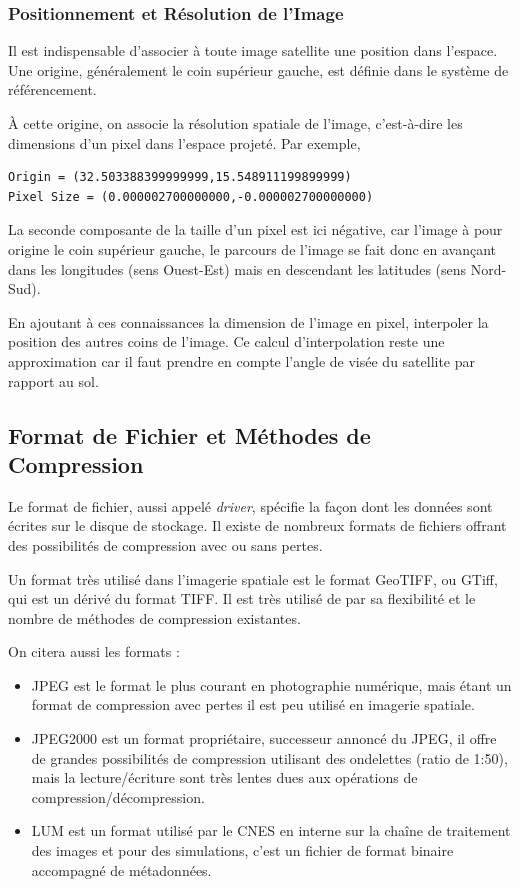 \documentclass[a4paper, 10pt]{report}
\begin{document}
\subsubsection{Positionnement et Résolution de l'Image}
Il est indispensable d'associer à toute image satellite une position dans l'espace. Une origine, généralement le coin supérieur gauche, est définie dans le système de référencement.

À cette origine, on associe la résolution spatiale de l'image, c'est-à-dire les dimensions d'un pixel dans l'espace projeté.
Par exemple,
\begin{verbatim}
Origin = (32.503388399999999,15.548911199899999)
Pixel Size = (0.000002700000000,-0.000002700000000)
\end{verbatim}
La seconde composante de la taille d'un pixel est ici négative, car l'image à pour origine le coin supérieur gauche, le parcours de l'image se fait donc en avançant dans les longitudes (sens Ouest-Est) mais en descendant les latitudes (sens Nord-Sud).

En ajoutant à ces connaissances la dimension de l'image en pixel, interpoler la position des autres coins de l'image. Ce calcul d'interpolation reste une approximation car il faut prendre en compte l'angle de visée du satellite par rapport au sol.

\subsection{Format de Fichier et Méthodes de Compression}
Le format de fichier, aussi appelé \emph{driver}, spécifie la façon dont les données sont écrites sur le disque de stockage.
Il existe de nombreux formats de fichiers offrant des possibilités de compression avec ou sans pertes.

Un format très utilisé dans l'imagerie spatiale est le format GeoTIFF, ou GTiff, qui est un dérivé du format TIFF. Il est très utilisé de par sa flexibilité et le nombre de méthodes de compression existantes.

On citera aussi les formats :
\begin{itemize}
	\item JPEG est le format le plus courant en photographie numérique, mais étant un format de compression avec pertes il est peu utilisé en imagerie spatiale.
	\item JPEG2000 est un format propriétaire, successeur annoncé du JPEG, il offre de grandes possibilités de compression utilisant des ondelettes (ratio de 1:50), mais la lecture/écriture sont très lentes dues aux opérations de compression/décompression.
	\item LUM est un format utilisé par le CNES en interne sur la chaîne de traitement des images et pour des simulations, c'est un fichier de format binaire accompagné de métadonnées.
\end{itemize}
\end{document}
